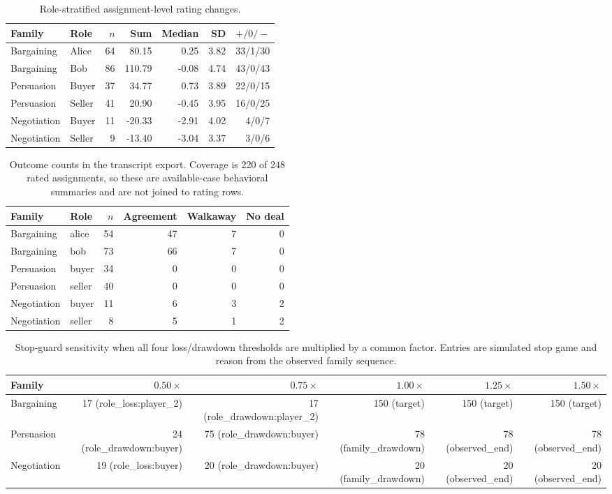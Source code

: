 \begin{table}[t]
\caption{Role-stratified assignment-level rating changes.}
\label{tab:v33-role-distribution}
\centering\scriptsize
\begin{tabular}{llrrrrr}
\toprule
Family & Role & $n$ & Sum & Median & SD & $+ / 0 / -$ \\
\midrule
Bargaining & Alice & 64 & 80.15 & 0.25 & 3.82 & 33/1/30 \\
Bargaining & Bob & 86 & 110.79 & -0.08 & 4.74 & 43/0/43 \\
Persuasion & Buyer & 37 & 34.77 & 0.73 & 3.89 & 22/0/15 \\
Persuasion & Seller & 41 & 20.90 & -0.45 & 3.95 & 16/0/25 \\
Negotiation & Buyer & 11 & -20.33 & -2.91 & 4.02 & 4/0/7 \\
Negotiation & Seller & 9 & -13.40 & -3.04 & 3.37 & 3/0/6 \\
\bottomrule
\end{tabular}
\end{table}

\begin{table}[t]
\caption{Outcome counts in the transcript export. Coverage is 220 of 248 rated assignments, so these are available-case behavioral summaries and are not joined to rating rows.}
\label{tab:v33-transcript-outcomes}
\centering\scriptsize
\begin{tabular}{llrrrr}
\toprule
Family & Role & $n$ & Agreement & Walkaway & No deal \\
\midrule
Bargaining & alice & 54 & 47 & 7 & 0 \\
Bargaining & bob & 73 & 66 & 7 & 0 \\
Persuasion & buyer & 34 & 0 & 0 & 0 \\
Persuasion & seller & 40 & 0 & 0 & 0 \\
Negotiation & buyer & 11 & 6 & 3 & 2 \\
Negotiation & seller & 8 & 5 & 1 & 2 \\
\bottomrule
\end{tabular}
\end{table}

\begin{table}[t]
\caption{Stop-guard sensitivity when all four loss/drawdown thresholds are multiplied by a common factor. Entries are simulated stop game and reason from the observed family sequence.}
\label{tab:v33-stop-sensitivity}
\centering\scriptsize
\begin{tabular}{lrrrrr}
\toprule
Family & $0.50\times$ & $0.75\times$ & $1.00\times$ & $1.25\times$ & $1.50\times$ \\
\midrule
Bargaining & 17 (role\_loss:player\_2) & 17 (role\_drawdown:player\_2) & 150 (target) & 150 (target) & 150 (target) \\
Persuasion & 24 (role\_drawdown:buyer) & 75 (role\_drawdown:buyer) & 78 (family\_drawdown) & 78 (observed\_end) & 78 (observed\_end) \\
Negotiation & 19 (role\_loss:buyer) & 20 (role\_drawdown:buyer) & 20 (family\_drawdown) & 20 (observed\_end) & 20 (observed\_end) \\
\bottomrule
\end{tabular}
\end{table}
